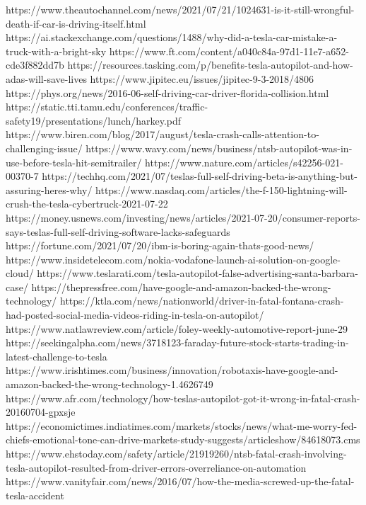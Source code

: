 https://www.theautochannel.com/news/2021/07/21/1024631-is-it-still-wrongful-death-if-car-is-driving-itself.html
https://ai.stackexchange.com/questions/1488/why-did-a-tesla-car-mistake-a-truck-with-a-bright-sky
https://www.ft.com/content/a040c84a-97d1-11e7-a652-cde3f882dd7b
https://resources.tasking.com/p/benefits-tesla-autopilot-and-how-adas-will-save-lives
https://www.jipitec.eu/issues/jipitec-9-3-2018/4806
https://phys.org/news/2016-06-self-driving-car-driver-florida-collision.html
https://static.tti.tamu.edu/conferences/traffic-safety19/presentations/lunch/harkey.pdf
https://www.biren.com/blog/2017/august/tesla-crash-calls-attention-to-challenging-issue/
https://www.wavy.com/news/business/ntsb-autopilot-was-in-use-before-tesla-hit-semitrailer/
https://www.nature.com/articles/s42256-021-00370-7
https://techhq.com/2021/07/teslas-full-self-driving-beta-is-anything-but-assuring-heres-why/
https://www.nasdaq.com/articles/the-f-150-lightning-will-crush-the-tesla-cybertruck-2021-07-22
https://money.usnews.com/investing/news/articles/2021-07-20/consumer-reports-says-teslas-full-self-driving-software-lacks-safeguards
https://fortune.com/2021/07/20/ibm-is-boring-again-thats-good-news/
https://www.insidetelecom.com/nokia-vodafone-launch-ai-solution-on-google-cloud/
https://www.teslarati.com/tesla-autopilot-false-advertising-santa-barbara-case/
https://thepressfree.com/have-google-and-amazon-backed-the-wrong-technology/
https://ktla.com/news/nationworld/driver-in-fatal-fontana-crash-had-posted-social-media-videos-riding-in-tesla-on-autopilot/
https://www.natlawreview.com/article/foley-weekly-automotive-report-june-29
https://seekingalpha.com/news/3718123-faraday-future-stock-starts-trading-in-latest-challenge-to-tesla
https://www.irishtimes.com/business/innovation/robotaxis-have-google-and-amazon-backed-the-wrong-technology-1.4626749
https://www.afr.com/technology/how-teslas-autopilot-got-it-wrong-in-fatal-crash-20160704-gpxsje
https://economictimes.indiatimes.com/markets/stocks/news/what-me-worry-fed-chiefs-emotional-tone-can-drive-markets-study-suggests/articleshow/84618073.cms
https://www.ehstoday.com/safety/article/21919260/ntsb-fatal-crash-involving-tesla-autopilot-resulted-from-driver-errors-overreliance-on-automation
https://www.vanityfair.com/news/2016/07/how-the-media-screwed-up-the-fatal-tesla-accident


